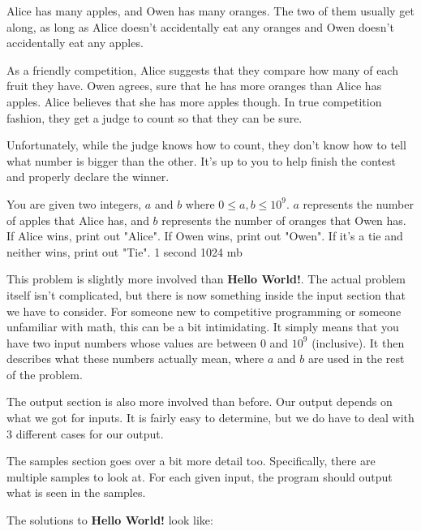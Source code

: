 {Alice has many apples, and Owen has many oranges. The two of them usually get along, as long as Alice doesn't accidentally eat any oranges and Owen doesn't accidentally eat any apples.

As a friendly competition, Alice suggests that they compare how many of each fruit they have. Owen agrees, sure that he has more oranges than Alice has apples. Alice believes that she has more apples though. In true competition fashion, they get a judge to count so that they can be sure.

Unfortunately, while the judge knows how to count, they don't know how to tell what number is bigger than the other. It's up to you to help finish the contest and properly declare the winner.}
{You are given two integers, $a$ and $b$ where $0 \leq a,b \leq 10^9$. $a$ represents the number of apples that Alice has, and $b$ represents the number of oranges that Owen has.}
{If Alice wins, print out "Alice". If Owen wins, print out "Owen". If it's a tie and neither wins, print out "Tie".}
{1 second}
{1024 mb}
{
}

\hrulefill

This problem is slightly more involved than \textbf{Hello World!}. The actual problem itself isn't complicated, but there is now something inside the input section that we have to consider. For someone new to competitive programming or someone unfamiliar with math, this can be a bit intimidating. It simply means that you have two input numbers whose values are between 0 and $10^9$ (inclusive). It then describes what these numbers actually mean, where $a$ and $b$ are used in the rest of the problem.

The output section is also more involved than before. Our output depends on what we got for inputs. It is fairly easy to determine, but we do have to deal with 3 different cases for our output.

The samples section goes over a bit more detail too. Specifically, there are multiple samples to look at. For each given input, the program should output what is seen in the samples.

\hrulefill

The solutions to \textbf{Hello World!} look like:


